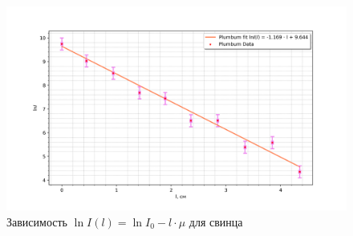\documentclass[a4paper]{article}
\begin{document}
\begin{enumerate}
    \begin{figure}[H]
        \begin{center}
        \includegraphics[scale = 0.65]{Pb.png}
        \caption{Зависимость $\ln{I}(l) = \ln{I_0} -  l\cdot \mu $ для свинца}
        \label{Pb}
        \end{center}
    \end{figure}


\end{enumerate}
\end{document}

